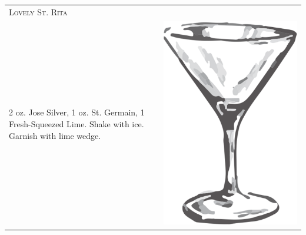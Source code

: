 \documentclass{article}
\begin{document}
\begin{tabular}{p{2in} p{0.5in}}
\multicolumn{2}{p{3in}}{\centering\Huge\textsc{Lovely St. Rita}} \\ 
  \vspace{-0.1in}2 oz. Jose Silver, 1 oz. St. Germain, 1 Fresh-Squeezed Lime. Shake with ice.  Garnish with lime wedge. &
  \vspace{-0.1in} \includegraphics{goblet.png}
\end{tabular}
\end{document}
